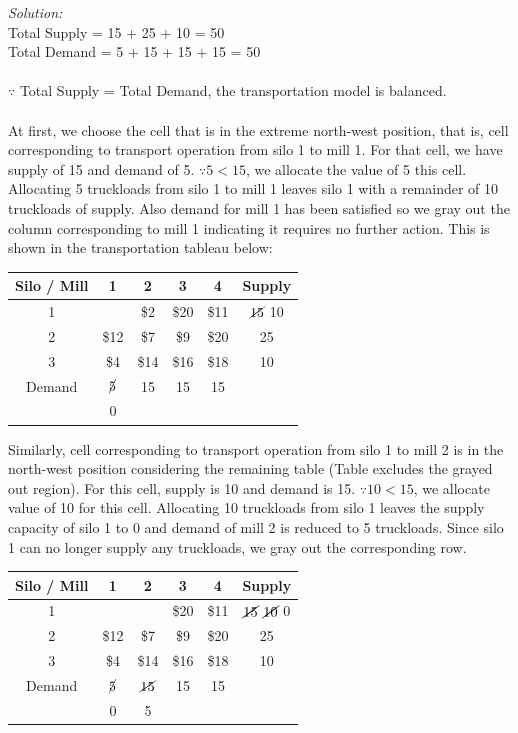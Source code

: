 \textit{Solution:}\\
Total Supply = 15 + 25 + 10 = 50\\
Total Demand = 5 + 15 + 15 + 15 = 50\\\\
$\because$ Total Supply = Total Demand, the transportation model is balanced.\\\\
At first, we choose the cell that is in the extreme north-west position, that is, cell corresponding to transport operation from silo 1 to mill 1. For that cell, we have supply of 15 and demand of 5. $ \because 5 < 15$, we allocate the value of 5 this cell. Allocating 5 truckloads from silo 1 to mill 1 leaves silo 1 with a remainder of 10 truckloads of supply. Also demand for mill 1 has been satisfied so we gray out the column corresponding to mill 1 indicating it requires no further action. This is shown in the transportation tableau below:
\begin{center}
	\begin{tabular}{c | c | c | c | c | c}
		Silo / Mill & 1 & 2 & 3 & 4 & \textbf{Supply}\\ 
		\hline
		1 & \innerbox{\$10}{5} \cellcolor[gray]{0.8} & \$2 & \$20 & \$11 & $ \cancel{15} $ 10\\
		\hline
		2 & \$12 \cellcolor[gray]{0.8} & \$7 & \$9 & \$20 & 25\\
		\hline
		3 & \$4 \cellcolor[gray]{0.8} & \$14 & \$16 & \$18 & 10\\
		\hline
		Demand & $ \cancel{5} $ & 15 & 15 & 15 & \\
		 & 0 & & & & 
	\end{tabular}
\end{center}
Similarly, cell corresponding to transport operation from silo 1 to mill 2 is in the north-west position considering the remaining table (Table excludes the grayed out region). For this cell, supply is 10 and demand is 15. $\because 10 < 15$, we allocate value of 10 for this cell. Allocating 10 truckloads from silo 1 leaves the supply capacity of silo 1 to 0 and demand of mill 2 is reduced to 5 truckloads. Since silo 1 can no longer supply any truckloads, we gray out the corresponding row.
\begin{center}
	\begin{tabular}{c | c | c | c | c | c}
		Silo / Mill & 1 & 2 & 3 & 4 & \textbf{Supply}\\ 
		\hline
		1 & \innerbox{\$10}{5} \cellcolor[gray]{0.8} & \innerbox{\$2}{10} \cellcolor[gray]{0.8} & \$20 \cellcolor[gray]{0.8} & \$11 \cellcolor[gray]{0.8} & $ \cancel{15} $ $ \cancel{10} $ 0\\
		\hline
		2 & \$12 \cellcolor[gray]{0.8} & \$7 & \$9 & \$20 & 25\\
		\hline
		3 & \$4 \cellcolor[gray]{0.8} & \$14 & \$16 & \$18 & 10\\
		\hline
		Demand & $ \cancel{5} $ & $ \cancel{15} $ & 15 & 15 & \\
		& 0 & 5 & & & 
	\end{tabular}
\end{center}
